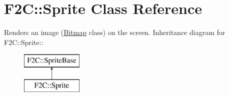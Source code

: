 \hypertarget{class_f2_c_1_1_sprite}{
\section{F2C::Sprite Class Reference}
\label{class_f2_c_1_1_sprite}
}


Renders an image (\hyperlink{class_f2_c_1_1_bitmap}{Bitmap} class) on the screen.  
Inheritance diagram for F2C::Sprite::\begin{figure}[H]
\begin{center}
\leavevmode
\includegraphics[height=2cm]{class_f2_c_1_1_sprite}
\end{center}
\end{figure}
